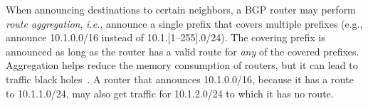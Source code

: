\documentclass[numbers, 10pt, preprint]{sigplanconf}
\newcommand{\IE}{\emph{i.e.}}
\newcommand{\ETC}{\emph{etc.}}
\begin{document}

When announcing destinations to certain neighbors, a BGP router may perform {\em route aggregation}, \IE, announce a single prefix that covers multiple prefixes (e.g., announce 10.1.0.0/16 instead of 10.1.[1--255].0/24). The covering prefix is announced as long as the router has a valid route for {\em any} of the covered prefixes. Aggregation helps reduce the memory consumption of routers, but it can lead to traffic black holes~\cite{route-aggregation}. A router that announces 10.1.0.0/16, because it has a route to 10.1.1.0/24, may also get traffic for 10.1.2.0/24 to which it has no route.

\end{document}
